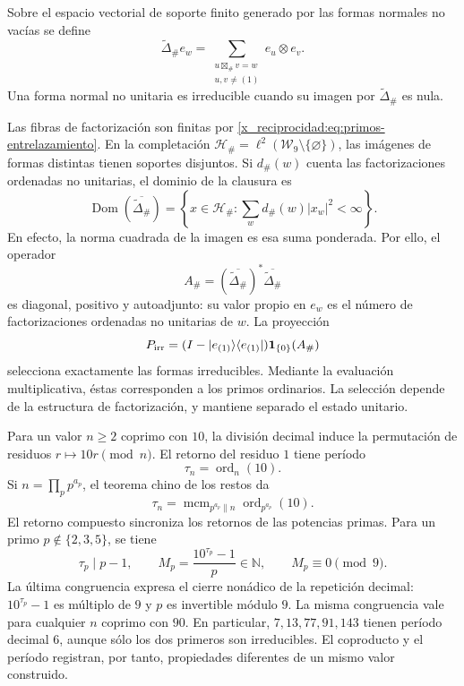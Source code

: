 \begin{definition}
Sobre el espacio vectorial de soporte finito generado por las formas
normales no vacías se define
\[
 \widetilde\Delta_\# e_w
 =\sum_{\substack{u\boxtimes_\#v=w\\u,v\ne(1)}}e_u\otimes e_v.
\]
Una forma normal no unitaria es irreducible cuando su imagen por
\(\widetilde\Delta_\#\) es nula.
\end{definition}

Las fibras de factorización son finitas por
\eqref{x_reciprocidad:eq:primos-entrelazamiento}. En la completación
\(\mathcal H_\#=\ell^2(\mathcal W_9\setminus\{\varnothing\})\),
las imágenes de formas distintas tienen soportes disjuntos. Si
\(d_\#(w)\) cuenta las factorizaciones ordenadas no unitarias, el dominio
de la clausura es
\[
 \operatorname{Dom}(\overline{\widetilde\Delta_\#})
 =\left\{x\in\mathcal H_\#:
       \sum_w d_\#(w)|x_w|^2<\infty\right\}.
\]
En efecto, la norma cuadrada de la imagen es esa suma ponderada. Por ello,
el operador
\[
 A_\#=(\overline{\widetilde\Delta_\#})^*
                  \overline{\widetilde\Delta_\#}
\]
es diagonal, positivo y autoadjunto: su valor propio en \(e_w\) es el
número de factorizaciones ordenadas no unitarias de \(w\). La proyección
\[
 P_{\rm irr}=(I-|e_{(1)}\rangle\langle e_{(1)}|)
                    \mathbf1_{\{0\}}(A_\#)
\]
selecciona exactamente las formas irreducibles. Mediante la evaluación
multiplicativa, éstas corresponden a los primos ordinarios. La selección
depende de la estructura de factorización, y mantiene separado el estado
unitario.

Para un valor \(n\geq2\) coprimo con \(10\), la división decimal induce la
permutación de residuos \(r\mapsto10r\pmod n\). El retorno del residuo
\(1\) tiene período
\[
 \tau_n=\operatorname{ord}_n(10).
\]
Si \(n=\prod_p p^{a_p}\), el teorema chino de los restos da
\[
 \tau_n=\operatorname{mcm}_{p^{a_p}\parallel n}
                    \operatorname{ord}_{p^{a_p}}(10).
\]
El retorno compuesto sincroniza los retornos de las potencias primas.
Para un primo \(p\notin\{2,3,5\}\), se tiene
\[
 \tau_p\mid p-1,\qquad
 M_p=\frac{10^{\tau_p}-1}{p}\in\mathbb N,
 \qquad M_p\equiv0\pmod9.
\]
La última congruencia expresa el cierre nonádico de la repetición decimal:
\(10^{\tau_p}-1\) es múltiplo de \(9\) y \(p\) es invertible módulo
\(9\). La misma congruencia vale para cualquier \(n\) coprimo con
\(90\). En particular, \(7,13,77,91,143\) tienen período decimal \(6\),
aunque sólo los dos primeros son irreducibles. El coproducto y el período
registran, por tanto, propiedades diferentes de un mismo valor construido.

